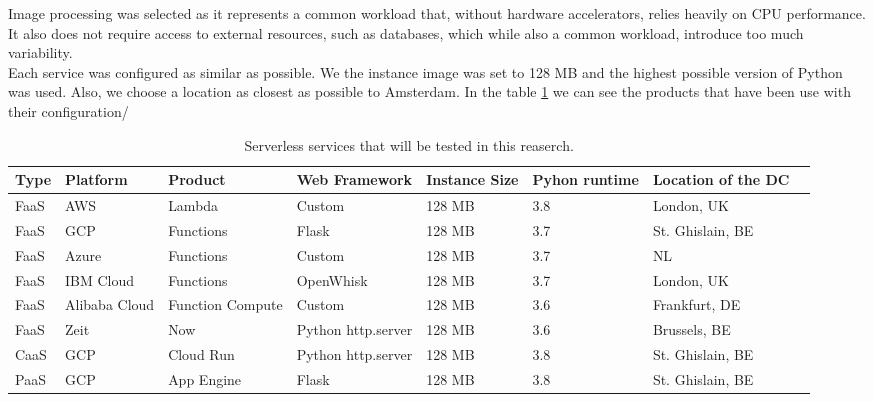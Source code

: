 \documentclass[11pt]{article}
\begin{document}
Image processing was selected as it represents a common workload that, without hardware accelerators, relies heavily on CPU performance. It also does not require access to external resources, such as databases, which while also a common workload, introduce too much variability. \\

Each service was configured as similar as possible. We the instance image was set to 128 MB and the highest possible version of Python was used. Also, we choose a location as closest as possible to Amsterdam. In the table \ref{Tab:services} we can see the products that have been use with their configuration/




\begin{table}
\centering
 \begin{tabularx}{1\textwidth}{X X X X X X X X}
 \textbf{Type} & \textbf{Platform} & \textbf{Product} & \textbf{Web Framework} & \textbf{Instance Size} & \textbf{Pyhon runtime} & \textbf{Location of the DC} \\
 \hline
 \hline
 FaaS & AWS & Lambda & Custom & 128 MB & 3.8 & London, UK \\
 \hline
 FaaS & GCP & Functions & Flask & 128 MB & 3.7 & St. Ghislain, BE \\
 \hline
 FaaS & Azure & Functions & Custom & 128 MB & 3.7 & NL \\
 \hline
 FaaS & IBM Cloud & Functions & OpenWhisk & 128 MB & 3.7 & London, UK\\
 \hline
 FaaS & Alibaba Cloud & Function Compute & Custom & 128 MB & 3.6 & Frankfurt, DE\\
 \hline
 FaaS & Zeit & Now & Python http.server  & 128 MB & 3.6 & Brussels, BE\\
 \hline
 CaaS & GCP & Cloud Run & Python http.server & 128 MB & 3.8 & St. Ghislain, BE\\
 \hline
 PaaS & GCP & App Engine & Flask & 128 MB & 3.8 & St. Ghislain, BE\\

\end{tabularx}
\caption{Serverless services that will be tested in this reaserch.}
\label{Tab:services}

\end{table}
\end{document}
